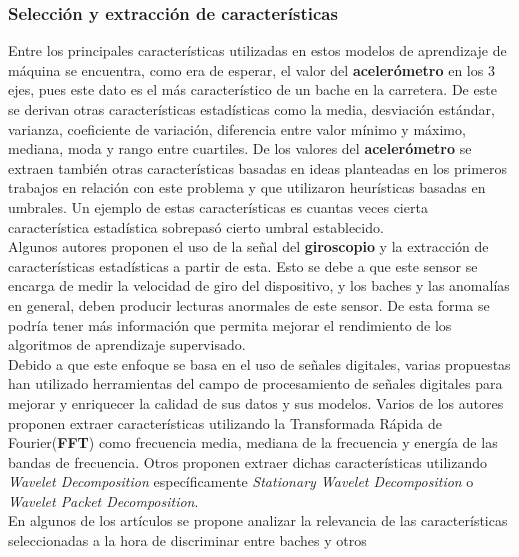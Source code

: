 		\subsubsection{Selección y extracción de características}
			Entre los principales características utilizadas en estos modelos de aprendizaje de máquina se encuentra, como era de esperar, el valor 
			del \textbf{acelerómetro} en los 3 ejes, pues este dato es el más característico de un bache en la carretera. De este se derivan otras
			características estadísticas como la media, desviación estándar, varianza, coeficiente de variación, diferencia entre valor mínimo y
			máximo, mediana, moda y rango entre cuartiles. De los valores del \textbf{acelerómetro} se extraen también otras características basadas en ideas planteadas en los primeros
			trabajos en relación con este problema y que utilizaron heurísticas basadas en umbrales. Un ejemplo de estas características es cuantas  veces
			cierta característica estadística sobrepasó cierto umbral establecido.\\
			\indent Algunos autores proponen el uso de la señal del \textbf{giroscopio} y la extracción de características estadísticas a partir de esta.
			Esto se debe a que este sensor se encarga de medir la velocidad de giro del dispositivo, y los baches y las anomalías en general, deben producir
			lecturas anormales de este sensor. De esta forma se podría tener más información que permita mejorar el rendimiento de los algoritmos de aprendizaje
			supervisado.\\
			\indent Debido a que este enfoque se basa en el uso de señales digitales, varias propuestas han utilizado herramientas del campo de procesamiento
			de señales digitales para mejorar y enriquecer la calidad de sus datos y sus modelos. Varios de los autores proponen extraer características utilizando
			la Transformada Rápida de Fourier(\textbf{FFT}) como frecuencia media, mediana de la frecuencia y energía de las bandas de frecuencia. Otros proponen extraer dichas características utilizando \emph{Wavelet Decomposition} específicamente \emph{Stationary Wavelet
			Decomposition} o \emph{Wavelet Packet Decomposition}.\\
			\indent En algunos de los artículos se propone analizar la relevancia de las características seleccionadas a la hora de discriminar entre baches y otros

